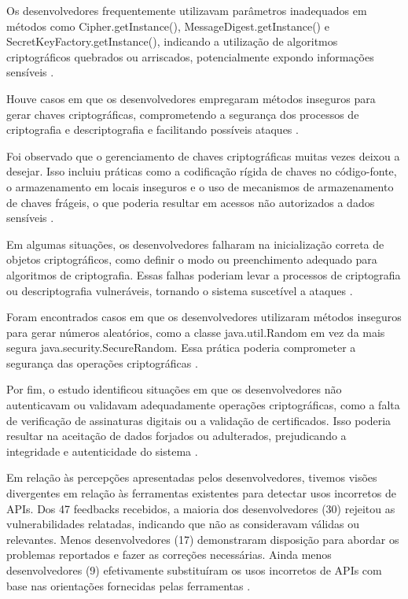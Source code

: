 Os desenvolvedores frequentemente utilizavam parâmetros inadequados em métodos como Cipher.getInstance(), MessageDigest.getInstance() e SecretKeyFactory.getInstance(), indicando a utilização de algoritmos criptográficos quebrados ou arriscados, potencialmente expondo informações sensíveis \cite{api_misuses_zhang}.

Houve casos em que os desenvolvedores empregaram métodos inseguros para gerar chaves criptográficas, comprometendo a segurança dos processos de criptografia e descriptografia e facilitando possíveis ataques \cite{api_misuses_zhang}.

Foi observado que o gerenciamento de chaves criptográficas muitas vezes deixou a desejar. Isso incluiu práticas como a codificação rígida de chaves no código-fonte, o armazenamento em locais inseguros e o uso de mecanismos de armazenamento de chaves frágeis, o que poderia resultar em acessos não autorizados a dados sensíveis \cite{api_misuses_zhang}.

Em algumas situações, os desenvolvedores falharam na inicialização correta de objetos criptográficos, como definir o modo ou preenchimento adequado para algoritmos de criptografia. Essas falhas poderiam levar a processos de criptografia ou descriptografia vulneráveis, tornando o sistema suscetível a ataques \cite{api_misuses_zhang}.

Foram encontrados casos em que os desenvolvedores utilizaram métodos inseguros para gerar números aleatórios, como a classe java.util.Random em vez da mais segura java.security.SecureRandom. Essa prática poderia comprometer a segurança das operações criptográficas \cite{api_misuses_zhang}.

Por fim, o estudo identificou situações em que os desenvolvedores não autenticavam ou validavam adequadamente operações criptográficas, como a falta de verificação de assinaturas digitais ou a validação de certificados. Isso poderia resultar na aceitação de dados forjados ou adulterados, prejudicando a integridade e autenticidade do sistema \cite{api_misuses_zhang}.



Em relação às percepções apresentadas pelos desenvolvedores, tivemos visões divergentes em relação às ferramentas existentes para detectar usos incorretos de APIs. Dos 47 feedbacks recebidos, a maioria dos desenvolvedores (30) rejeitou as vulnerabilidades relatadas, indicando que não as consideravam válidas ou relevantes. Menos desenvolvedores (17) demonstraram disposição para abordar os problemas reportados e fazer as correções necessárias. Ainda menos desenvolvedores (9) efetivamente substituíram os usos incorretos de APIs com base nas orientações fornecidas pelas ferramentas \cite{api_misuses_zhang}.

